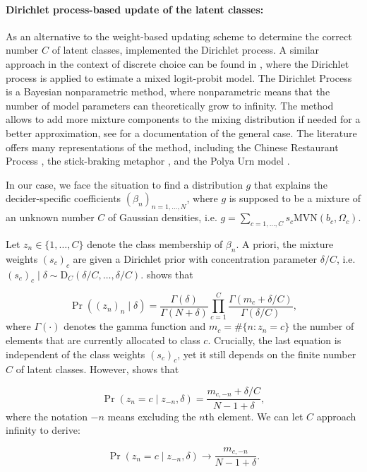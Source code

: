 \documentclass[article]{jss}
\begin{document}
\paragraph{Dirichlet process-based update of the latent classes:}

As an alternative to the weight-based updating scheme to determine the correct number $C$ of latent classes,  implemented the Dirichlet process. A similar approach in the context of discrete choice can be found in \cite{Burda:2008}, where the Dirichlet process is applied to estimate a mixed logit-probit model. The Dirichlet Process is a Bayesian nonparametric method, where nonparametric means that the number of model parameters can theoretically grow to infinity. The method allows to add more mixture components to the mixing distribution if needed for a better approximation, see \cite{Neal:2000} for a documentation of the general case. The literature offers many representations of the method, including the Chinese Restaurant Process \citep{Aldous:1985}, the stick-braking metaphor \citep{Sethuraman:1994}, and the Polya Urn model \citep{Blackwell:1973}.

In our case, we face the situation to find a distribution $g$ that explains the decider-specific coefficients $(\beta_n)_{n = 1,\dots,N}$, where $g$ is supposed to be a mixture of an unknown number $C$ of Gaussian densities, i.e. $g = \sum_{c = 1,\dots,C} s_c \text{MVN}(b_c, \Omega_c)$.

Let $z_n \in \{1,\dots,C\}$ denote the class membership of $\beta_n$. A priori, the mixture weights $(s_c)_c$ are given a Dirichlet prior with concentration parameter $\delta/C$, i.e. $(s_c)_c \mid \delta \sim \text{D}_C(\delta/C,\dots,\delta/C)$. \cite{Rasmussen:2000} shows that

$$ \Pr((z_n)_n\mid \delta) = \frac{\Gamma(\delta)}{\Gamma(N+\delta)} \prod_{c=1}^C \frac{\Gamma(m_c + \delta/C)}{\Gamma(\delta/C)}, $$
where $\Gamma(\cdot)$ denotes the gamma function and $m_c = \#\{n:z_n = c\}$ the number of elements that are currently allocated to class $c$. Crucially, the last equation is independent of the class weights $(s_c)_c$, yet it still depends on the finite number $C$ of latent classes. However, \cite{Li:2019} shows that

$$ \Pr(z_n = c \mid z_{-n}, \delta) = \frac{m_{c,-n} + \delta/C}{N-1+\delta},$$
where the notation $-n$ means excluding the $n$th element. We can let $C$ approach infinity to derive:

$$ \Pr(z_n = c \mid z_{-n}, \delta) \to \frac{m_{c,-n}}{N-1+\delta}. $$
\end{document}
